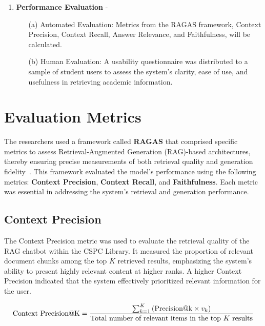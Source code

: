 \begin{refsection}
\begin{enumerate}
    \item \textbf{Performance Evaluation} - 
        \begin{enumerate}
            \item [(a)] {Automated Evaluation:} Metrics from the RAGAS framework, Context Precision, Context Recall, Answer Relevance, and Faithfulness, will be calculated.
            \item [(b)] {Human Evaluation:} A usability questionnaire was distributed to a sample of student users to assess the system’s clarity, ease of use, and usefulness in retrieving academic information.
        \end{enumerate}

\end{enumerate}


\section{Evaluation Metrics}

\hspace{0.4cm}The researchers used a framework called \textbf{RAGAS} that comprised specific metrics to assess Retrieval-Augmented Generation (RAG)-based architectures, thereby ensuring precise measurements of both retrieval quality and generation fidelity~\cite{oubah2024advanced}. This framework evaluated the model's performance using the following metrics: \textbf{Context Precision}, \textbf{Context Recall}, and \textbf{Faithfulness}. Each metric was essential in addressing the system’s retrieval and generation performance.

\subsection*{Context Precision}

The Context Precision metric was used to evaluate the retrieval quality of the RAG chatbot within the CSPC Library. It measured the proportion of relevant document chunks among the top $K$ retrieved results, emphasizing the system's ability to present highly relevant content at higher ranks. A higher Context Precision indicated that the system effectively prioritized relevant information for the user.

\begin{equation}
\centering
\text{Context Precision@K} = 
\frac{
    \sum_{k=1}^{K} \left( \text{Precision@k} \times v_k \right)
}{
    \text{Total number of relevant items in the top } K \text{ results}
}
\end{equation}


\end{refsection}
